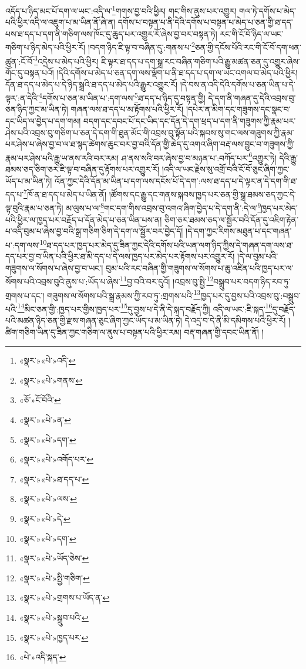 འདོད་པ་ཉིད་མང་པོ་དག་ལ་ཡང་:འདི་ལ་\footnote{«སྣར་»«པེ་»འདི་}གགས་བྱ་བའི་ཕྱིར། གང་གིས་ནུས་པར་འགྱུར། གལ་ཏེ་དགོས་པ་མེད་པའི་ཕྱིར་འདི་ལ་འཇུག་པ་མ་ཡིན་ནོ་ཞེ་ན། དགོས་པ་བསྟན་པ་ནི་དེའི་དགོས་པ་བསྟན་པ་མེད་པ་ཅན་གྱི་ཐ་དད་པས་ཐ་དད་པ་དག་ནི་གཅིག་ལས་ཁོང་དུ་ཆུད་པར་འགྱུར་རོ་ཞེས་བྱ་བར་བསྟན་ཏེ། རང་གི་ངོ་བོ་ཉིད་ལ་ཡང་གཅིག་པ་ཉིད་མེད་པའི་ཕྱིར་རོ། །བདག་ཉིད་ཇི་ལྟ་བ་བཞིན་དུ་:གནས་པ་\footnote{«སྣར་»«པེ་»གནས་}ཅན་གྱི་དངོས་པོའི་རང་གི་ངོ་བོ་དག་ཕན་ཚུན་:ངོ་བོ་\footnote{«ཅོ་»ངོ་བོའི་}འདྲེས་པ་མེད་པའི་ཕྱིར། ཇི་ལྟར་ཐ་དད་པ་དག་སྒྲ་རང་བཞིན་གཅིག་པའི་རྒྱུ་མཚན་ཅན་དུ་འགྱུར་ཞེས་གོང་དུ་བསྟན་པའོ། །དེའི་དགོས་པ་མེད་པ་ཅན་དག་ལས་ལྡོག་པ་ནི་ཐ་དད་པ་དག་ལ་ཡང་འགལ་བ་མེད་པའི་ཕྱིར། དོན་ཐ་དད་པ་མེད་པ་དེ་ཉིད་སྒྲའི་ཐ་དད་པ་མེད་པའི་རྒྱུར་འགྱུར་རོ། །དེ་བས་ན་འདི་དེའི་དགོས་པ་ཅན་ཡིན་པ་དེ་ལྟར་:ན་དེའི་\footnote{«སྣར་»«པེ་»ན་}དགོས་པ་ཅན་མ་ཡིན་པ་:དག་ལས་\footnote{«སྣར་»«པེ་»དག་}ཐ་དད་པ་ཉིད་དུ་བསྟན་གྱི། དེ་དག་ནི་གཞན་དུ་དེའི་འབྲས་བུ་ཅན་ཉིད་ཀྱང་མ་ཡིན་ཏེ། གཞན་ལས་ཐ་དད་པ་མ་རྟོགས་པའི་ཕྱིར་རོ། །དཔེར་ན་མིག་དང་གཟུགས་དང་སྣང་བ་དང་ཡིད་ལ་བྱེད་པ་དག་གམ། བདག་དང་དབང་པོ་དང་ཡིད་དང་དོན་དེ་དག་ཕྲད་པ་དག་ནི་གཟུགས་ཀྱི་རྣམ་པར་ཤེས་པའི་འབྲས་བུ་གཅིག་པ་ཅན་དེ་དག་གི་ཐུན་མོང་གི་འབྲས་བུ་སྟོན་པའི་སྐབས་སུ་གང་ལས་གཟུགས་ཀྱི་རྣམ་པར་ཤེས་པ་ཞེས་བྱ་བ་ལ་ཐ་སྙད་ཚེགས་ཆུང་བར་བྱ་བའི་དོན་གྱི་ཆེད་དུ་འགའ་ཞིག་བརྡ་ལས་བྱུང་བ་གཟུགས་ཀྱི་རྣམ་པར་ཤེས་པའི་རྒྱུ་ཡ་ནས་རའི་བར་རམ། ཤ་ནས་སའི་བར་ཞེས་བྱ་བ་མཉན་པ་:བཀོད་པར་\footnote{«སྣར་»«པེ་»འགོད་པར་}འགྱུར་ཏེ། དེའི་རྒྱུ་ཐམས་ཅད་ཅིག་ཅར་ཇི་ལྟ་བ་བཞིན་དུ་རྟོགས་པར་འགྱུར་རོ། །འདི་ལ་ཡང་རྗེས་སུ་འགྲོ་བའི་ངོ་བོ་ཅུང་ཞིག་ཀྱང་ཡོད་པ་མ་ཡིན་ཏེ། འོན་ཀྱང་དེའི་དོན་མ་ཡིན་པ་དག་ལས་དངོས་པོ་དེ་དག་:ལས་ཐ་དད་པ་དེ་ལྟར་ན་དེ་དག་གི་ཐ་དད་པ་\footnote{«སྣར་»«པེ་»ཐ་དད་པ་}ཁོ་ན་ཐ་དད་པ་མེད་པ་ཡིན་ནོ། །ཚོགས་དང་རྒྱུ་དང་གནས་སྐབས་ཁྱད་པར་ཅན་གྱི་སྒྲ་ཐམས་ཅད་ཀྱང་དེ་ལྟ་བུའི་རྣམ་པ་ཅན་ཏེ། མ་ལུས་པ་ལ་\footnote{«སྣར་»«པེ་»ལས་}གང་དག་གིས་འབྲས་བུ་འགའ་ཞིག་བྱེད་པ་དེ་དག་ནི་:དེ་ལ་\footnote{«སྣར་»«པེ་»དེ་}ཁྱད་པར་མེད་པའི་ཕྱིར་ལ་ཁྱད་པར་བརྗོད་པ་དོན་མེད་པ་ཅན་ཡིན་པས་ན། ཅིག་ཅར་ཐམས་ཅད་ལ་སྦྱོར་བའི་དོན་དུ་འཇིག་རྟེན་པ་འདི་བུམ་པ་ཞེས་བྱ་བའི་སྒྲ་གཅིག་ཅིག་དེ་དག་ལ་སྦྱོར་བར་བྱེད་དོ། །དེ་དག་ཀྱང་རིགས་མཐུན་པ་དང་གཞན་པ་:དག་ལས་\footnote{«སྣར་»«པེ་»དག་}ཐ་དད་པར་ཁྱད་པར་མེད་དུ་ཟིན་ཀྱང་དེའི་དགོས་པའི་ཡན་ལག་ཉིད་ཀྱིས་དེ་གཞན་དག་ལས་ཐ་དད་པར་བྱ་བ་ཡིན་པའི་ཕྱིར་ཐ་མི་དད་པ་དེ་ལས་ཁྱད་པར་མེད་པར་རྟོགས་པར་འགྱུར་རོ། །དེ་ལ་བུམ་པའི་གཟུགས་ལ་སོགས་པ་ཞེས་བྱ་བ་ཡང་། བུམ་པའི་རང་བཞིན་གྱི་གཟུགས་ལ་སོགས་པ་ཆུ་འཛིན་པའི་ཁྱད་པར་ལ་སོགས་པའི་འབྲས་བུའི་ནུས་པ་:ཡོད་པ་ཞེས་\footnote{«སྣར་»«པེ་»ཡོད་ཅེས་}བྱ་བའི་བར་དུའོ། །འབྲས་བུ་སྤྱི་\footnote{«སྣར་»«པེ་»སྤྱི་གཅིག་}བསྒྲུབ་པར་བདག་ཉིད་རབ་ཏུ་གྲགས་པ་དང་། གཟུགས་ལ་སོགས་པའི་སྒྲ་རྣམས་ཀྱི་རབ་ཏུ་:གྲགས་པའི་\footnote{«སྣར་»«པེ་»གྲགས་པ་ཡོད་ན་}ཁྱད་པར་དུ་བྱས་པའི་འབྲས་བུ་:བསྒྲུབ་པའི་\footnote{«སྣར་»«པེ་»སྒྲུབ་པའི་}མིང་ཅན་གྱི་:ཁྱད་པར་གྱིས་ཁྱད་པར་\footnote{«སྣར་»«པེ་»ཁྱད་པར་}དུ་བྱས་པ་དེ་ནི་དེ་སྐད་བརྗོད་ཀྱི། འདི་ལ་ཡང་:ཇི་སྐད་\footnote{«པེ་»འདི་སྐད་}དུ་བརྗོད་པའི་མཚན་ཉིད་ཅན་གྱི་རྫས་གཞན་ཅུང་ཞིག་ཀྱང་ཡོད་པ་མ་ཡིན་ཏེ། དེ་འདྲ་བ་དེ་ནི་མི་དམིགས་པའི་ཕྱིར་རོ། །ཚིག་གཅིག་ཡིན་དུ་ཟིན་ཀྱང་གཅིག་ལ་ནུས་པ་བསྟན་པའི་ཕྱིར་རམ། བརྡ་གཞན་གྱི་དབང་ཡིན་ནོ། །
